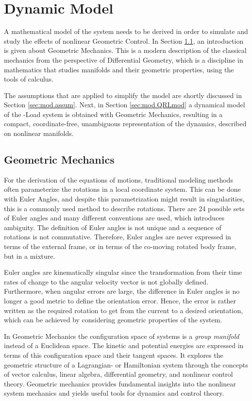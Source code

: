 \chapter{Dynamic Model} \label{ch:model}
A mathematical model of the system needs to be derived in order to simulate and study the effects of nonlinear Geometric Control. In Section \ref{sec:mod.geometric}, an introduction is given about Geometric Mechanics. This is a modern description of the classical mechanics from the perspective of Differential Geometry, which is a discipline in mathematics that studies manifolds and their geometric properties, using the tools of calculus. 

The assumptions that are applied to simplify the model are shortly discussed in Section \ref{sec:mod.assum}. Next, in Section \ref{sec:mod.QRLmod} a dynamical model of the -Load system is obtained with Geometric Mechanics, resulting in a compact, coordinate-free, unambiguous representation of the dynamics, described on nonlinear manifolds.

\section{Geometric Mechanics}\label{sec:mod.geometric}
For the derivation of the equations of motions, traditional modeling methods often parameterize the rotations in a local coordinate system. 
This can be done with Euler Angles, and despite this parametrization might result in singularities, this is a commonly used method to describe rotations. 
There are 24 possible sets of Euler angles and many different conventions are used, which introduces ambiguity. The definition of Euler angles is not unique and a sequence of rotations is not commutative. Therefore, Euler angles are never expressed in terms of the external frame, or in terms of the co-moving rotated body frame, but in a mixture.

Euler angles are kinematically singular since the transformation from their time rates of change to the angular velocity vector is not globally defined. Furthermore, when angular errors are large, the difference in Euler angles is no longer a good metric to define the orientation error. 
Hence, the error is rather written as the required rotation to get from the current to a desired orientation, which can be achieved by considering geometric properties of the system.

In Geometric Mechanics the configuration space of systems is a \textit{group manifold} instead of a Euclidean space. The kinetic and potential energies are expressed in terms of this configuration space and their tangent spaces. It explores the geometric structure of a Lagrangian- or Hamiltonian system through the concepts of vector calculus, linear algebra, differential geometry, and nonlinear control theory. Geometric mechanics provides fundamental insights into the nonlinear system mechanics and yields useful tools for dynamics and control theory.


